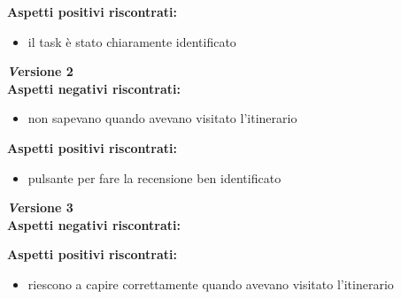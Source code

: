 \textbf{Aspetti positivi riscontrati:}
\begin{itemize}[label=-]

\item il task è stato chiaramente identificato

\end{itemize}

\textbf{\emph Versione 2}\\
\textbf{Aspetti negativi riscontrati:}
\begin{itemize}[label=-]

\item non sapevano quando avevano visitato l'itinerario

\end{itemize}

\textbf{Aspetti positivi riscontrati:}
\begin{itemize}[label=-]

\item pulsante per fare la recensione ben identificato

\end{itemize}

\textbf{\emph Versione 3}\\
\textbf{Aspetti negativi riscontrati:}
\newline\newline

\textbf{Aspetti positivi riscontrati:}
\begin{itemize}[label=-]

\item riescono a capire correttamente quando avevano visitato l'itinerario

\end{itemize}


